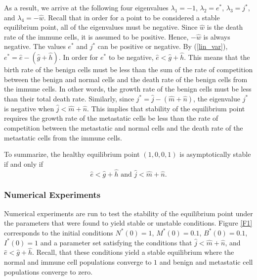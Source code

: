 \documentclass[letter,10pt]{article}
\begin{document}
As a result, we arrive at the following four eigenvalues $\lambda_1 = -1$,  $\lambda_2 = e^*$,  $\lambda_3 = j^*$, and $\lambda_4 = -\hat{w}$. Recall that in order for a point to be considered a stable equilibrium point, all of the eigenvalues must be negative.   Since $\hat{w}$ is the death rate of the immune cells, it is assumed to be positive. Hence, $-\hat{w}$ is always negative. The values $e ^* $ and $j^*$ can be positive or negative. By (\ref{lin_var}), $e^* = \hat{e}-(\hat{g}+\hat{h})$. In order for $e^*$ to be negative, $\hat{e} < \hat{g}+\hat{h}$. This means that the birth rate of the benign cells must be less than the sum of the rate of competition between the benign and normal cells and the death rate of the benign cells from the immune cells. In other words, the growth rate of the benign cells must be less than their total death rate. Similarly, since $j^*=\hat{j}-(\hat{m}+\hat{n})$, the eigenvalue $j^*$ is negative when $\hat{j}<\hat{m}+\hat{n}$.  This implies that stability of the equilibrium point requires the growth rate of the metastatic cells be less than the rate of competition between the metastatic and normal cells and the death rate of the metastatic cells from the immune cells. 

To summarize, the healthy equilibrium point $(1,0,0,1)$ is asymptotically stable if and only if
\begin{equation}
\hat{e} < \hat{g}+\hat{h} \mbox{ and } \hat{j}<\hat{m}+\hat{n}. \label{nec_suf_stability}
\end{equation}

\subsubsection{Numerical Experiments}
Numerical experiments are run to test the stability of the equilibrium point under the parameters that were found to yield stable or unstable conditions. Figure \ref{F1} corresponds to the  initial conditions $N^*(0)=1$, $M^*(0)=0.1$, $B^*(0)=0.1$, $I^*(0)=1$ 
and a parameter set satisfying the conditions that $\hat{j}< \hat{m}+\hat{n}$, and $\hat{e}<\hat{g}+\hat{h}$. Recall, that these conditions yield a stable equilibrium where the normal and immune cell populations converge to $1$ and benign and metastatic cell populations converge to zero. 
%
\end{document}
